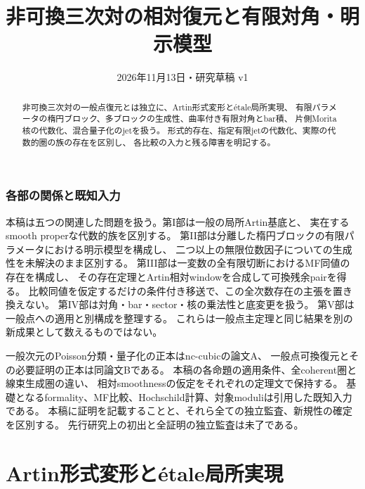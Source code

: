 
\title{非可換三次対の相対復元と有限対角・明示模型}
\author{}
\date{2026年11月13日・研究草稿 v1}

\maketitle
\begin{abstract}
非可換三次対の一般点復元とは独立に、Artin形式変形とétale局所実現、
有限パラメータの楕円ブロック、多ブロックの生成性、曲率付き有限対角とbar積、
片側Morita核の代数化、混合量子化のjetを扱う。
形式的存在、指定有限jetの代数化、実際の代数的圏の族の存在を区別し、
各比較の入力と残る障害を明記する。
\end{abstract}
\section*{各部の関係と既知入力}
本稿は五つの関連した問題を扱う。第I部は一般の局所Artin基底と、
実在するsmooth properな代数的族を区別する。
第II部は分離した楕円ブロックの有限パラメータにおける明示模型を構成し、
二つ以上の無限位数因子についての生成性を未解決のまま区別する。
第III部は一変数の全有限切断におけるMF同値の存在を構成し、
その存在定理とArtin相対windowを合成して可換残余pairを得る。
比較同値を仮定するだけの条件付き移送で、この全次数存在の主張を置き換えない。
第IV部は対角・bar・sector・核の乗法性と底変更を扱う。
第V部は一般点への適用と別構成を整理する。
これらは一般点主定理と同じ結果を別の新成果として数えるものではない。

一般次元のPoisson分類・量子化の正本はnc-cubicの論文A、
一般点可換復元とその必要証明の正本は同論文Bである。
本稿の各命題の適用条件、全coherent圏と線束生成圏の違い、
相対smoothnessの仮定をそれぞれの定理文で保持する。
基礎となるformality、MF比較、Hochschild計算、対象moduliは引用した既知入力である。
本稿に証明を記載することと、それら全ての独立監査、新規性の確定を区別する。
先行研究上の初出と全証明の独立監査は未了である。
\tableofcontents

\part{Artin形式変形とétale局所実現}







